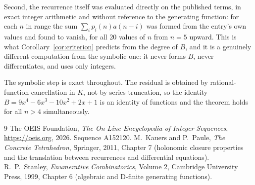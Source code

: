 \documentclass[11pt,a4paper]{article}
\theoremstyle{plain}
\theoremstyle{definition}
\begin{document}
Second, the recurrence itself was evaluated directly on the published terms, in exact
integer arithmetic and without reference to the generating function: for each $n$ in range
the sum $\sum_{i}p_{i}(n)a(n-i)$ was formed from the entry's own values and found to
vanish, for all 20 values of $n$ from $n=5$ upward. This is what
Corollary~\ref{cor:criterion} predicts from the degree of $B$, and it is a genuinely
different computation from the symbolic one: it never forms $B$, never differentiates, and
uses only integers.

The symbolic step is exact throughout. The residual is obtained by rational-function
cancellation in $K$, not by series truncation, so the identity $B=9 x^{4} - 6 x^{3} - 10 x^{2} + 2 x + 1$ is an
identity of functions and the theorem holds for all $n>4$ simultaneously.

\begin{thebibliography}{9}
 The OEIS Foundation, \emph{The On-Line Encyclopedia of Integer Sequences},
\url{https://oeis.org}, 2026. Sequence A152120.
 M.~Kauers and P.~Paule, \emph{The Concrete Tetrahedron}, Springer, 2011,
Chapter 7 (holonomic closure properties and the translation between recurrences and
differential equations).
 R.~P.~Stanley, \emph{Enumerative Combinatorics}, Volume 2, Cambridge
University Press, 1999, Chapter 6 (algebraic and D-finite generating functions).
\end{thebibliography}
\end{document}
